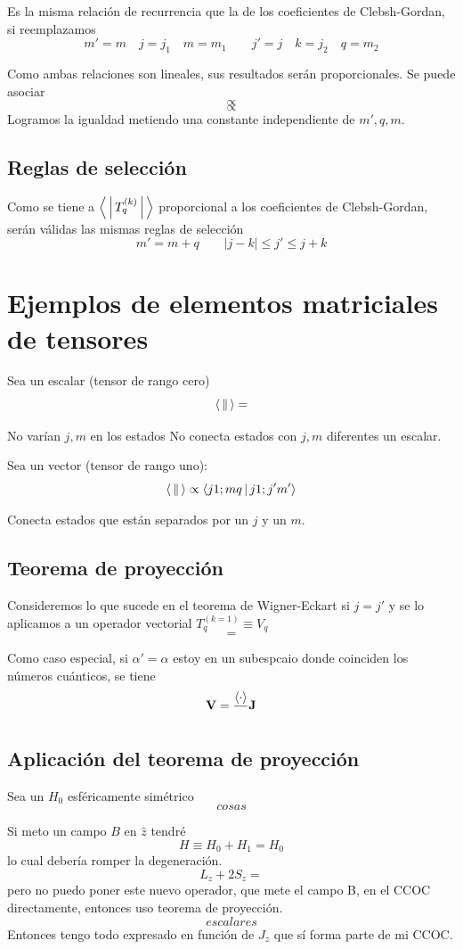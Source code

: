 \documentclass[10pt,oneside]{CBFT_book}
\begin{document}
Es la misma relación de recurrencia que la de los coeficientes de Clebsh-Gordan, si reemplazamos
\[
	m'=m \quad j=j_1 \quad m=m_1 \qquad j'=j \quad k=j_2 \quad q=m_2
\]

Como ambas relaciones son lineales, sus resultados serán proporcionales.
Se puede asociar 
\[
	\propto 
\]
\[
	\propto
\]
Logramos la igualdad metiendo una constante independiente de $m',q,m$.

\subsection{Reglas de selección}

Como se tiene a $\Braket{|T_q^{(k)}|}$ proporcional a los coeficientes de Clebsh-Gordan, serán válidas las 
mismas reglas de selección 
\[
	m' = m + q \qquad |j-k| \leq j' \leq j+k
\]

\section{Ejemplos de elementos matriciales de tensores}

Sea un escalar (tensor de rango cero)
\[
	\Braket{||} =
\]

No varían $j,m$ en los estados No conecta estados con $j,m$ diferentes un escalar.

Sea un vector (tensor de rango uno):
\[
	\Braket{||} \propto \Braket{j 1;m q|j 1;j' m'}
\]

Conecta estados que están separados por un $j$ y un $m$.

\subsection{Teorema de proyección}

Consideremos lo que sucede en el teorema de Wigner-Eckart si $j=j'$ y se lo aplicamos a un operador vectorial 
$T_q^{(k=1)} \equiv V_q$
\[
	=
\]

Como caso especial, si $\alpha' =\alpha$ estoy en un subespcaio donde coinciden los números cuánticos, se 
tiene
\[
	\vb{V} = \frac{\Braket{\cdot}}{} \vb{J}
\]

\subsection{Aplicación del teorema de proyección}

Sea un $H_0$ esféricamente simétrico 
\[
	cosas
\]

Si meto un campo $B$ en $\hat{z}$ tendré 
\[
	H \equiv H_0 + H_1 = H_0
\]
lo cual debería romper la degeneración.
\[
	L_z + 2S_z =
\]
pero no puedo poner este nuevo operador, que mete el campo B, en el CCOC directamente, entonces uso teorema 
de proyección.
\[
	escalares
\]
Entonces tengo todo expresado en función de $J_z$ que sí forma parte de mi CCOC.
\end{document}
